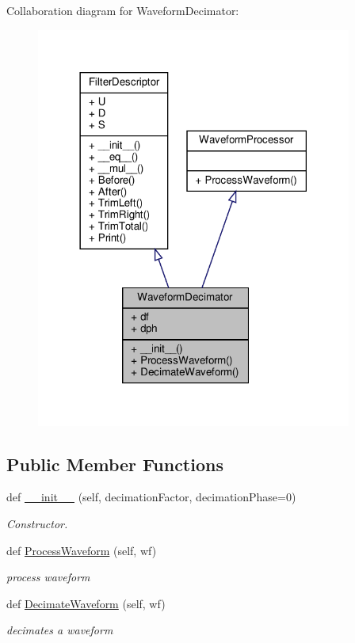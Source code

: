 Collaboration diagram for Waveform\+Decimator\+:\nopagebreak
\begin{figure}[H]
\begin{center}
\leavevmode
\includegraphics[width=294pt]{classSignalIntegrity_1_1TimeDomain_1_1Filters_1_1WaveformDecimator_1_1WaveformDecimator__coll__graph}
\end{center}
\end{figure}
\subsection*{Public Member Functions}
\begin{DoxyCompactItemize}
\item 
def \hyperlink{classSignalIntegrity_1_1TimeDomain_1_1Filters_1_1WaveformDecimator_1_1WaveformDecimator_a82d726dbf6a2595a4939e36f886dc24b}{\+\_\+\+\_\+init\+\_\+\+\_\+} (self, decimation\+Factor, decimation\+Phase=0)
\begin{DoxyCompactList}\small\item\em Constructor. \end{DoxyCompactList}\item 
def \hyperlink{classSignalIntegrity_1_1TimeDomain_1_1Filters_1_1WaveformDecimator_1_1WaveformDecimator_ae09bec195c9cb1d5819e73b7be169b11}{Process\+Waveform} (self, wf)
\begin{DoxyCompactList}\small\item\em process waveform \end{DoxyCompactList}\item 
def \hyperlink{classSignalIntegrity_1_1TimeDomain_1_1Filters_1_1WaveformDecimator_1_1WaveformDecimator_af90fbe6c62fc6e0c9c21732e9c094a9a}{Decimate\+Waveform} (self, wf)
\begin{DoxyCompactList}\small\item\em decimates a waveform \end{DoxyCompactList}\end{DoxyCompactItemize}


